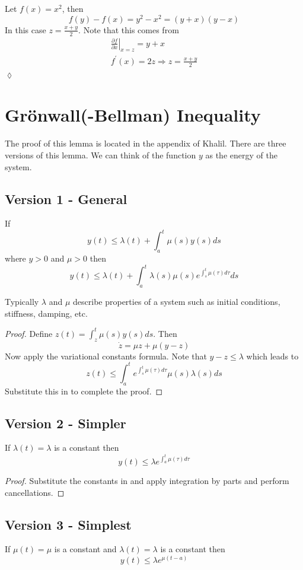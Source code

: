 \begin{example}
Let $f(x) = x^2$, then
$$f(y) - f(x) = y^2 - x^2 = (y+x)(y-x)$$
In this case $z=\frac{x+y}{2}$. Note that this comes from
\begin{align*}
\left.\frac{\partial f}{\partial x}\right|_{x=z} = y+x \\
f^\prime(x) = 2z \Rightarrow z = \frac{x+y}{2}
\end{align*}
$\lozenge$
\end{example}

\section{Gr\"onwall(-Bellman) Inequality}
The proof of this lemma is located in the appendix of Khalil. There are three versions of this lemma. We can think of the function $y$ as the energy of the system.

\subsection{Version 1 - General}
\begin{lemma}
If
$$y(t) \leq \lambda(t) + \int_a^t\mu(s)y(s)ds$$
where $y>0$ and $\mu>0$ then
$$y(t) \leq \lambda(t) + \int_a^t \lambda(s)\mu(s) e^{\int_s^t\mu(\tau)d\tau}ds$$
\end{lemma}
Typically $\lambda$ and $\mu$ describe properties of a system such as initial conditions, stiffness, damping, etc.

\begin{proof}
Define $z(t) = \int_z^t \mu(s)y(s)ds$. Then
$$\dot{z} = \mu z + \mu(y-z)$$
Now apply the variational constants formula. Note that $y-z\leq\lambda$ which leads to
$$z(t) \leq \int_a^t e^{\int_s^t \mu(\tau)d\tau}\mu(s)\lambda(s)ds$$
Substitute this in to complete the proof.
\end{proof}

\subsection{Version 2 - Simpler}
\begin{lemma}
If $\lambda(t) = \lambda$ is a constant then
$$y(t) \leq \lambda e^{\int_a^t \mu(\tau)d\tau}$$
\end{lemma}

\begin{proof}
Substitute the constants in and apply integration by parts and perform cancellations.
\end{proof}

\subsection{Version 3 - Simplest}
\begin{lemma}
If $\mu(t) = \mu$ is a constant and $\lambda(t) = \lambda$ is a constant then
$$y(t) \leq \lambda e^{\mu(t-a)}$$
\end{lemma}
